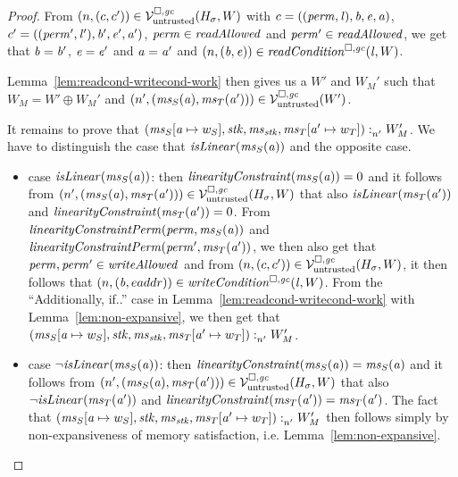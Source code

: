 \documentclass[a4paper]{article}
\begin{document}
\begin{proof}
  From $\npair{(c,c')}\in\lrv(H_\sigma,W)$ with $c = ((\perm,\lin),\baddr,\eaddr,\aaddr)$, $c' = ((\perm',\lin'),\baddr',\eaddr',\aaddr')$, $\perm \in \readAllowed{}$ and $\perm' \in \readAllowed{}$, we get that $\baddr = \baddr'$, $\eaddr = \eaddr'$ and $\aaddr = \aaddr'$ and $\npair{(\baddr,\eaddr)} \in \readCond{\lin,W}$.

  Lemma~\ref{lem:readcond-writecond-work} then gives us a $W'$ and $W_M'$ such that $W_M = W' \oplus W_M'$ and $\npair[n']{(\ms_S(\aaddr),\ms_T(\aaddr'))} \in \lrv(W')$.
  
  It remains to prove that $\memSat[n']{(\ms_S\update{\aaddr}{w_S},\stk,\ms_\stk,\ms_T\update{\aaddr'}{w_T})}{W_M'}$.
  We have to distinguish the case that $\isLinear{\ms_S(\aaddr)}$ and the opposite case.
  \begin{itemize}
  \item case $\isLinear{\ms_S(\aaddr)}$: then $\linCons{\ms_S(\aaddr)} = 0$ and it follows from $\npair[n']{(\ms_S(\aaddr),\ms_T(\aaddr'))}\in\lrv(H_\sigma,W)$ that also $\isLinear{\ms_T(\aaddr')}$  and $\linCons{\ms_T(\aaddr')} = 0$. 
    From $\linConsPerm{\perm}{\ms_S(\aaddr)}$ and $\linConsPerm{\perm'}{\ms_T(\aaddr')}$, we then also get that $\perm,\perm' \in \writeAllowed{}$ and from $\npair{(c,c')}\in\lrv(H_\sigma,W)$, it then follows that $\npair{(\baddr,eaddr)} \in \writeCond{\lin,W}$.
    From the ``Additionally, if..'' case in Lemma~\ref{lem:readcond-writecond-work} with Lemma~\ref{lem:non-expansive}, we then get that $\memSat[n']{(\ms_S\update{\aaddr}{w_S},\stk,\ms_\stk,\ms_T\update{\aaddr'}{w_T})}{W_M'}$.

  \item case $\neg\isLinear{\ms_S(\aaddr)}$: then $\linCons{\ms_S(\aaddr)} = \ms_S(\aaddr)$ and it follows from $\npair[n']{(\ms_S(\aaddr),\ms_T(\aaddr'))}\in\lrv(H_\sigma,W)$ that also $\neg\isLinear{\ms_T(\aaddr')}$  and $\linCons{\ms_T(\aaddr')} = \ms_T(\aaddr')$.
    The fact that $\memSat[n']{(\ms_S\update{\aaddr}{w_S},\stk,\ms_\stk,\ms_T\update{\aaddr'}{w_T})}{W_M'}$ then follows simply by non-expansiveness of memory satisfaction, i.e. Lemma~\ref{lem:non-expansive}.
  \end{itemize}
\end{proof}
\end{document}
